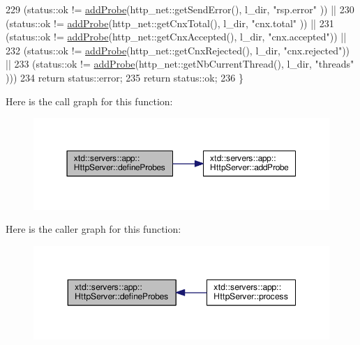 \begin{DoxyCode}
229       (status::ok != \hyperlink{classxtd_1_1servers_1_1app_1_1HttpServer_a0ff20a40a0e31dbb1e82be87be0e255f}{addProbe}(http\_net::getSendError(),        l\_dir,        \textcolor{stringliteral}{"rsp.error"}   )) ||
230       (status::ok != \hyperlink{classxtd_1_1servers_1_1app_1_1HttpServer_a0ff20a40a0e31dbb1e82be87be0e255f}{addProbe}(http\_net::getCnxTotal(),         l\_dir,        \textcolor{stringliteral}{"cnx.total"}   )) ||
231       (status::ok != \hyperlink{classxtd_1_1servers_1_1app_1_1HttpServer_a0ff20a40a0e31dbb1e82be87be0e255f}{addProbe}(http\_net::getCnxAccepted(),      l\_dir,        \textcolor{stringliteral}{"cnx.accepted"})) ||
232       (status::ok != \hyperlink{classxtd_1_1servers_1_1app_1_1HttpServer_a0ff20a40a0e31dbb1e82be87be0e255f}{addProbe}(http\_net::getCnxRejected(),      l\_dir,        \textcolor{stringliteral}{"cnx.rejected"})) ||
233       (status::ok != \hyperlink{classxtd_1_1servers_1_1app_1_1HttpServer_a0ff20a40a0e31dbb1e82be87be0e255f}{addProbe}(http\_net::getNbCurrentThread(),  l\_dir,        \textcolor{stringliteral}{"threads"}     )))
234     \textcolor{keywordflow}{return} status::error;
235   \textcolor{keywordflow}{return} status::ok;
236 \}
\end{DoxyCode}


Here is the call graph for this function\-:
\nopagebreak
\begin{figure}[H]
\begin{center}
\leavevmode
\includegraphics[width=350pt]{classxtd_1_1servers_1_1app_1_1HttpServer_a66c2a3b5bca8390d96b35daebfccabf3_cgraph}
\end{center}
\end{figure}




Here is the caller graph for this function\-:
\nopagebreak
\begin{figure}[H]
\begin{center}
\leavevmode
\includegraphics[width=348pt]{classxtd_1_1servers_1_1app_1_1HttpServer_a66c2a3b5bca8390d96b35daebfccabf3_icgraph}
\end{center}
\end{figure}


